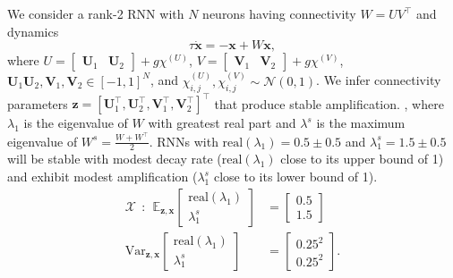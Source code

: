 \documentclass[11pt]{article}
\begin{document}
We consider a rank-2 RNN with $N$ neurons having connectivity $W = UV^\top$
 and dynamics
 \begin{equation}
 \tau \dot{\mathbf{x}} = -\mathbf{x} + W\mathbf{x},
 \end{equation}
where $U = \begin{bmatrix} \mathbf{U}_1 & \mathbf{U}_2 \end{bmatrix} + g \chi^{(U)}$, $V = \begin{bmatrix} \mathbf{V}_1 & \mathbf{V}_2 \end{bmatrix} + g\chi^{(V)}$, $\mathbf{U}_1 \mathbf{U}_2, \mathbf{V}_1, \mathbf{V}_2 \in \left[-1, 1 \right]^N$, and $\chi^{(U)}_{i,j}, \chi^{(V)}_{i,j} \sim \mathcal{N}(0, 1)$.
We infer connectivity parameters $\mathbf{z} = \left[\mathbf{U}_1^\top, \mathbf{U}_2^\top, \mathbf{V}_1^\top, \mathbf{V}_2^\top \right]^\top$   that produce stable amplification.
, where $\lambda_1$ is the eigenvalue of $W$ with greatest real part and $\lambda^s$ is the maximum eigenvalue of $W^s = \frac{W + W^\top}{2}$.
RNNs  with $\text{real}(\lambda_1) = 0.5 \pm 0.5$ and $\lambda_1^s = 1.5 \pm 0.5$ will be stable with modest decay rate ($\text{real}(\lambda_1)$ close to its upper bound of 1) and exhibit modest amplification ($\lambda_1^s$ close to its lower bound of 1).
\begin{equation}\label{eq:EP_LRRNN}
\begin{split}
\mathcal{X} ~~:~~ \mathbb{E}_{\mathbf{z}, \mathbf{x}} \begin{bmatrix} \text{real}(\lambda_1) \\ \lambda^s_1 \end{bmatrix} &= \begin{bmatrix} 0.5 \\ 1.5 \end{bmatrix} \\
\text{Var}_{\mathbf{z}, \mathbf{x}} \begin{bmatrix} \text{real}(\lambda_1) \\ \lambda^s_1 \end{bmatrix} &= \begin{bmatrix} 0.25^2 \\ 0.25^2 \end{bmatrix}.
\end{split}
\end{equation}
\end{document}
